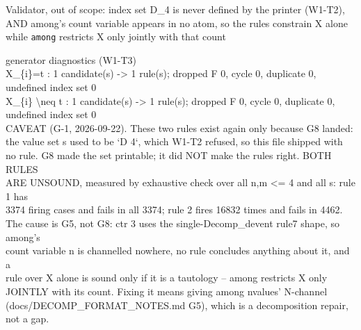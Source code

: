 \documentclass[10pt,a4paper]{article}
\newcommand{\diag}[1]{{\small\itshape\raggedright #1\par}}
\begin{document}
\diag{Validator, out of scope: index set D\_4 is never defined by the printer (W1-T2), AND among's count variable appears in no atom, so the rules constrain X alone while \texttt{among} restricts X only jointly with that count}

\diag{generator diagnostics (W1-T3)\\{} X\_\{i\}=t : 1 candidate(s) -> 1 rule(s); dropped F 0, cycle 0, duplicate 0, undefined index set 0\\{} X\_\{i\} \textbackslash{}neq t : 1 candidate(s) -> 1 rule(s); dropped F 0, cycle 0, duplicate 0, undefined index set 0\\{} CAVEAT (G-1, 2026-09-22). These two rules exist again only because G8 landed:\\{} the value set s used to be `D 4`, which W1-T2 refused, so this file shipped with\\{} no rule. G8 made the set printable; it did NOT make the rules right. BOTH RULES\\{} ARE UNSOUND, measured by exhaustive check over all n,m <= 4 and all s: rule 1 has\\{} 3374 firing cases and fails in all 3374; rule 2 fires 16832 times and fails in 4462.\\{} The cause is G5, not G8: ctr 3 uses the single-Decomp\_devent rule7 shape, so among's\\{} count variable n is channelled nowhere, no rule concludes anything about it, and a\\{} rule over X alone is sound only if it is a tautology -- among restricts X only\\{} JOINTLY with its count. Fixing it means giving among nvalues' N-channel\\{} (docs/DECOMP\_FORMAT\_NOTES.md G5), which is a decomposition repair, not a gap.}
\end{document}
